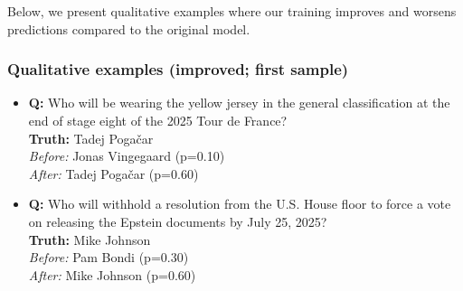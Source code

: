 Below, we present qualitative examples where our training improves and worsens predictions compared to the original model. 

\subsubsection*{Qualitative examples (improved; first sample)}
\begin{itemize}
\item \textbf{Q:} Who will be wearing the yellow jersey in the general classification at the end of stage eight of the 2025 Tour de France? \\
\textbf{Truth:} Tadej Poga{\v{c}}ar \\
\emph{Before:} Jonas Vingegaard (p=0.10) \\
\emph{After:} Tadej Poga{\v{c}}ar (p=0.60)

\item \textbf{Q:} Who will withhold a resolution from the U.S. House floor to force a vote on releasing the Epstein documents by July 25, 2025? \\
\textbf{Truth:} Mike Johnson \\
\emph{Before:} Pam Bondi (p=0.30) \\
\emph{After:} Mike Johnson (p=0.60)
\end{itemize}

